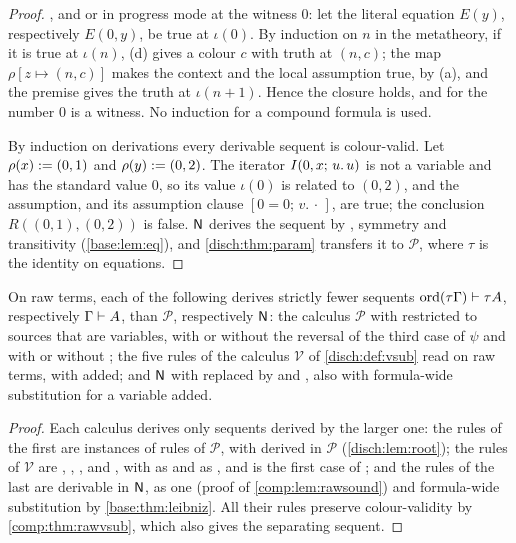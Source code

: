 \begin{proof}
, and  or  in progress mode at the
witness $0$: let the literal equation $E(y)$, respectively $E(0,y)$, be true
at $\iota(0)$. By induction on $n$ in the metatheory, if it is true at
$\iota(n)$, (d) gives a colour $c$ with truth at $(n,c)$; the map
$\rho[z\mapsto(n,c)]$ makes the context and the local assumption true, by
(a), and the premise gives the truth at $\iota(n+1)$. Hence the closure
holds, and for  the number $0$ is a witness. No induction for a
compound formula is used.

By induction on derivations every derivable sequent is colour-valid. Let
$\rho(x)\mathrel{:=}(0,1)$ and $\rho(y)\mathrel{:=}(0,2)$. The iterator
$I(0,x;\,u.\,u)$ is not a variable and has the standard value $0$, so its
value $\iota(0)$ is related to $(0,2)$, and the assumption, and its
assumption clause $[0=0;\,v.\,\cdot\,]$, are true; the conclusion
$R((0,1),(0,2))$ is false. $\mathsf{N}$ derives the sequent by ,
symmetry and transitivity (\cref{base:lem:eq}), and \cref{disch:thm:param}
transfers it to $\mathcal P$, where $\tau$ is the identity on equations.
\end{proof}

\begin{corollary}
\label{comp:cor:rawvsub}
On raw terms, each of the following derives strictly fewer sequents
$\operatorname{ord}(\tau\Gamma)\vdash\tau A$, respectively
$\Gamma\vdash A$, than $\mathcal P$, respectively $\mathsf{N}$: the calculus
$\mathcal P$ with  restricted to sources that are variables,
with or without the reversal of the third case of $\psi$ and with or without
; the five rules of the calculus $\mathcal V$ of
\cref{disch:def:vsub} read on raw terms, with  added; and
$\mathsf{N}$ with  replaced by  and , also
with formula-wide substitution for a variable added.
\end{corollary}

\begin{proof}
Each calculus derives only sequents derived by the larger one: the rules of
the first are instances of rules of $\mathcal P$, with 
derived in $\mathcal P$ (\cref{disch:lem:root}); the rules of $\mathcal V$
are , , ,  and
, with  as  and 
as , and  is the first case of
; and the rules of the last are derivable in $\mathsf{N}$,
 as one  (proof of \cref{comp:lem:rawsound}) and
formula-wide substitution by \cref{base:thm:leibniz}. All their rules
preserve colour-validity by \cref{comp:thm:rawvsub}, which also gives the
separating sequent.
\end{proof}

